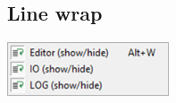 %
%
%
%
%


\hypertarget{menu_view_linewrap}{}
\subsection{Line wrap}

\includegraphics[scale=0.50]{./res/menu_view_linewrap.png}\\

